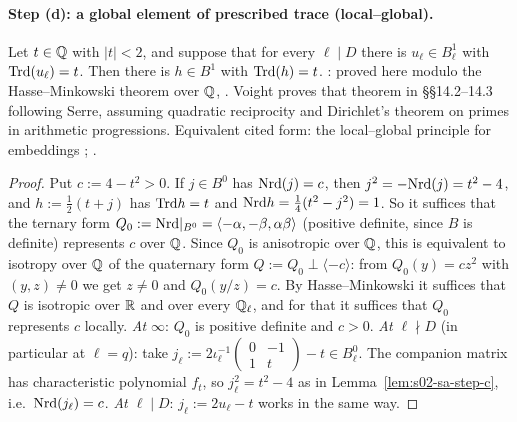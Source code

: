 \paragraph{Step (d): a global element of prescribed trace (local--global).}

\begin{proposition}[tex L02.SA(d)]\label{prop:s02-sa-step-d}
Let $t\in\mathbb{Q}$ with $|t|<2$, and suppose that for every $\ell\mid D$ there is $u_\ell\in B^1_\ell$ with $\mathrm{Trd}(u_\ell)=t$. Then
there is $h\in B^1$ with $\mathrm{Trd}(h)=t$.
\stpmc{}: proved here modulo the Hasse--Minkowski theorem over $\mathbb{Q}$, \stcited{}
. Voight proves that theorem in \S\S14.2--14.3 following Serre,
assuming quadratic reciprocity and Dirichlet's theorem on primes in arithmetic progressions. Equivalent cited form: the
local--global principle for embeddings ; .
\end{proposition}

\begin{proof}
Put $c:=4-t^2>0$. If $j\in B^0$ has $\mathrm{Nrd}(j)=c$, then $j^2=-\mathrm{Nrd}(j)=t^2-4$, and $h:=\frac12(t+j)$ has $\mathrm{Trd} h=t$ and
$\mathrm{Nrd} h=\frac14(t^2-j^2)=1$. So it suffices that the ternary form
$Q_0:=\mathrm{Nrd}|_{B^0}=\langle-\alpha,-\beta,\alpha\beta\rangle$ (positive definite, since $B$ is definite) represents $c$ over $\mathbb{Q}$. Since
$Q_0$ is anisotropic over $\mathbb{Q}$, this is equivalent to isotropy over $\mathbb{Q}$ of the quaternary form $Q:=Q_0\perp\langle-c\rangle$: from
$Q_0(y)=cz^2$ with $(y,z)\ne0$ we get $z\ne0$ and $Q_0(y/z)=c$. By Hasse--Minkowski it suffices that $Q$ is isotropic over $\mathbb{R}$ and
over every $\mathbb{Q}_\ell$, and for that it suffices that $Q_0$ represents $c$ locally.
\emph{At $\infty$}: $Q_0$ is positive definite and $c>0$.
\emph{At $\ell\nmid D$} (in particular at $\ell=q$): take
$j_\ell:=2\iota_\ell^{-1}\left(\begin{smallmatrix}0&-1\\1&t\end{smallmatrix}\right)-t\in B^0_\ell$. The companion matrix has
characteristic polynomial $f_t$, so $j_\ell^2=t^2-4$ as in Lemma~\ref{lem:s02-sa-step-c}, i.e.\ $\mathrm{Nrd}(j_\ell)=c$.
\emph{At $\ell\mid D$}: $j_\ell:=2u_\ell-t$ works in the same way.
\end{proof}

